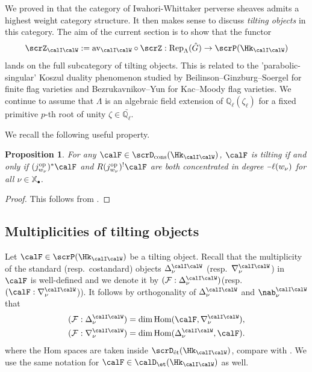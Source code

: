 \documentclass[10pt, reqno]{amsart}
\theoremstyle{plain}
\newtheorem{proposition}[theorem]{Proposition}
\theoremstyle{definition}
\newcommand{\minus}{\scalebox{0.75}[1.0]{$-$}}
\numberwithin{equation}{section}
\begin{document}
We proved in  that the category of Iwahori-Whittaker perverse sheaves admits a highest weight category structure. It then makes sense to discuss \textit{tilting objects} in this category. The aim of the current section is to show that the functor
\begin{equation}
	\scrZ_{\calI\calW}:=\mathrm{av}_{\calI\calW}\circ\scrZ: \mathrm{Rep}_\Lambda(\hat{G})\rightarrow \scrP(\Hk_{\calI\calW})
\end{equation}
lands on the full subcategory of tilting objects. This is related to the 'parabolic-singular' Koszul duality phenomenon studied by Beilinson--Ginzburg--Soergel \cite{BGS96} for finite flag varieties and Bezrukavnikov--Yun \cite{BY13} for Kac--Moody flag varieties. We continue to assume that $\Lambda$ is an algebraic field extension of $\mathbb{Q}_\ell(\zeta_\ell)$ for a fixed primitive $p$-th root of unity $\zeta \in \bar{\mathbb{Q}_\ell}$.

We recall the following useful property.
\begin{proposition}\label{prop_stalk_and_costalk_of_tilting_objects}
	For any $\calF\in \scrD_{\mathrm{cons}}(\Hk_{\calI\calW})$, $\calF$ is tilting if and only if $(j_{w_\nu}^{\mathrm{op}})^*\calF$ and $R(j_{w_\nu}^{\mathrm{op}})^!\calF$ are both concentrated in degree $\minus\ell(w_\nu)$ for all $\nu\in\mathbb{X}_\bullet$.
\end{proposition}
\begin{proof}
	This follows from \cite[Proposition 1.3]{BBM04}.
\end{proof}
\subsection{Multiplicities of tilting objects}Let $\calF\in \scrP(\Hk_{{\calI\calW}})$ be a tilting object. Recall that the multiplicity of the standard (resp.~costandard) objects $\Delta^{\calI\calW}_\nu$ (resp.~$\nabla^{\calI\calW}_\nu$) in $\calF$ is well-defined and we denote it by $(\mathcal{F}:\Delta^{\calI\calW}_\nu)$(resp. $(\calF: \nabla^{\calI\calW}_\nu$)). It follows by orthogonality of $\Delta_\nu^{\calI\calW}$ and $\nab_\nu^{\calI\calW}$ that
\begin{align}
	(\mathcal{F}:\Delta^{\calI\calW}_\nu)= \dim\mathrm{Hom} (\calF, \nabla^{\calI\calW}_\nu),\\
	(\mathcal{F}:\nabla^{\calI\calW}_\nu)= \dim\mathrm{Hom} ( \Delta^{\calI\calW}_\nu,\calF).
\end{align}
where the Hom spaces are taken inside $\scrD_{\mathrm{\acute{e}t}}(\Hk_{\calI\calW})$, compare with \cite[Theorem 3.2.1]{BGS96}. We use the same notation for $\calF\in \calD_\et(\Hk_{\calI\calW})$ as well.
\end{document}
